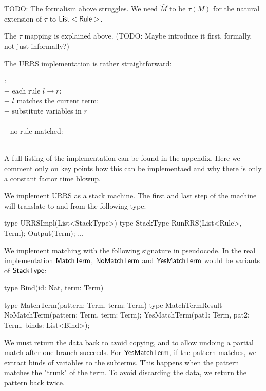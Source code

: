 \documentclass[11pt]{article}
\begin{document}
TODO: The formalism above struggles. We need $\hat M$ to be $\tau(M)$ for
the natural extension of $\tau$ to $\mathsf{List<Rule>}$.

The $\tau$ mapping is explained above. (TODO: Maybe introduce it first,
formally, not just informally?)

The URRS implementation is rather straightforward:

\begin{pseudo}
  : \\+
     each rule $l \to r$: \\+
       $l$ matches the current term: \\+
        substitute variables in $r$ \\
         \\--
     no rule matched: \\+
\end{pseudo}

A full listing of the implementation can be found in the appendix. Here
we comment only on key points how this can be implementaed and why there
is only a constant factor time blowup.

We implement URRS as a stack machine. The first and last step of the machine
will translate to and from the following type:

\begin{rrscode}
type URRSImpl(List<StackType>)
type StackType {
  RunRRS(List<Rule>, Term);
  Output(Term);
  ...
}
\end{rrscode}

We implement matching with the following signature in pseudocode.
In the real implementation $\mathsf{MatchTerm}$, $\mathsf{NoMatchTerm}$
and $\mathsf{YesMatchTerm}$ would be variants of $\mathsf{StackType}$:

\begin{rrscode}
type Bind(id: Nat, term: Term)

type MatchTerm(pattern: Term, term: Term)
type MatchTermResult {
  NoMatchTerm(pattern: Term, term: Term);
  YesMatchTerm(pat1: Term, pat2: Term, binds: List<Bind>);
}
\end{rrscode}

We must return the data back to avoid copying, and to allow undoing
a partial match after one branch succeeds. For $\mathsf{YesMatchTerm}$,
if the pattern matches, we extract binds of variables to the subterms.
This happens when the pattern matches the "trunk" of the term. To
avoid discarding the data, we return the pattern back twice.
\end{document}
